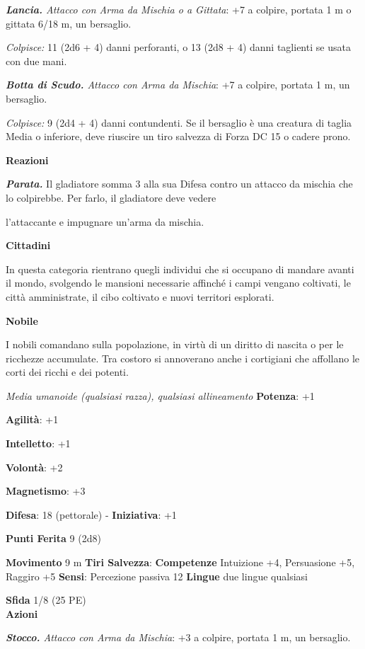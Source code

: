 \begin{multicols}{2}
\emph{\textbf{Lancia.} Attacco con Arma da Mischia o a Gittata}: +7 a
colpire, portata 1 m o gittata 6/18 m, un bersaglio.

\emph{Colpisce:} 11 (2d6 + 4) danni perforanti, o 13 (2d8 + 4) danni
taglienti se usata con due mani.

\emph{\textbf{Botta di Scudo.} Attacco con Arma da Mischia}: +7 a
colpire, portata 1 m, un bersaglio.

\emph{Colpisce:} 9 (2d4 + 4) danni contundenti. Se il bersaglio è una
creatura di taglia Media o inferiore, deve riuscire un tiro salvezza di Forza DC 15 o cadere prono.

\textbf{Reazioni}

\emph{\textbf{Parata.}} Il gladiatore somma 3 alla sua Difesa contro un
attacco da mischia che lo colpirebbe. Per farlo, il gladiatore deve
vedere

l'attaccante e impugnare un'arma da mischia.

\textbf{Cittadini}

In questa categoria rientrano quegli individui che si occupano di
mandare avanti il mondo, svolgendo le mansioni necessarie affinché i
campi vengano coltivati, le città amministrate, il cibo coltivato e
nuovi territori esplorati.

\textbf{Nobile}

I nobili comandano sulla popolazione, in virtù di un diritto di nascita
o per le ricchezze accumulate. Tra costoro si annoverano anche i
cortigiani che affollano le corti dei ricchi e dei potenti.

\emph{Media umanoide (qualsiasi razza), qualsiasi allineamento}
\textbf{Potenza}: +1

\textbf{Agilità}: +1

\textbf{Intelletto}: +1

\textbf{Volontà}: +2

\textbf{Magnetismo}: +3

\textbf{Difesa}: 18 (pettorale) - \textbf{Iniziativa}: +1

\textbf{Punti Ferita} 9 (2d8)

\textbf{Movimento} 9 m
\textbf{Tiri Salvezza}:
\textbf{Competenze} Intuizione +4, Persuasione +5, Raggiro +5
\textbf{Sensi}: Percezione passiva 12 \textbf{Lingue} due lingue
qualsiasi

\textbf{Sfida} 1/8 (25 PE)\smallskip\\

\smallskip\textbf{Azioni}

\emph{\textbf{Stocco.} Attacco con Arma da Mischia}: +3 a colpire,
portata 1 m, un bersaglio.


\end{multicols}
